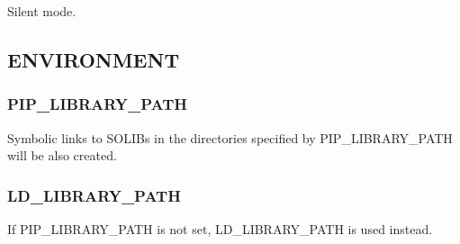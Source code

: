 Silent mode.\hypertarget{group__piplnlibs_environment}{}\subsection{E\-N\-V\-I\-R\-O\-N\-M\-E\-N\-T}\label{group__piplnlibs_environment}
\hypertarget{group__piplnlibs_PIP_LIBRARY_PATH}{}\subsubsection{P\-I\-P\-\_\-\-L\-I\-B\-R\-A\-R\-Y\-\_\-\-P\-A\-T\-H}\label{group__piplnlibs_PIP_LIBRARY_PATH}
Symbolic links to S\-O\-L\-I\-Bs in the directories specified by P\-I\-P\-\_\-\-L\-I\-B\-R\-A\-R\-Y\-\_\-\-P\-A\-T\-H will be also created.\hypertarget{group__piplnlibs_LD_LIBRARY_PATH}{}\subsubsection{L\-D\-\_\-\-L\-I\-B\-R\-A\-R\-Y\-\_\-\-P\-A\-T\-H}\label{group__piplnlibs_LD_LIBRARY_PATH}
If P\-I\-P\-\_\-\-L\-I\-B\-R\-A\-R\-Y\-\_\-\-P\-A\-T\-H is not set, L\-D\-\_\-\-L\-I\-B\-R\-A\-R\-Y\-\_\-\-P\-A\-T\-H is used instead. 